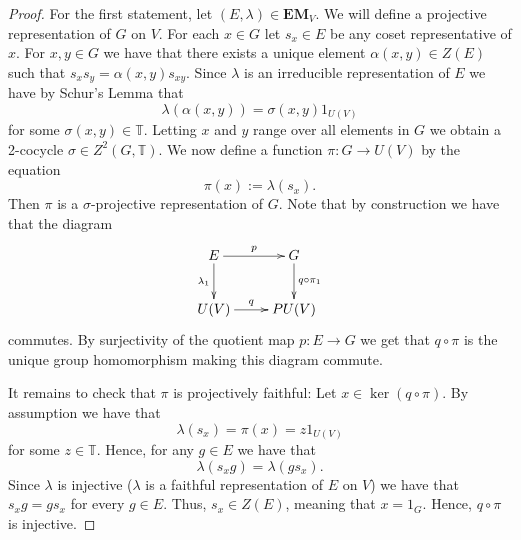\documentclass[10pt,a4paper]{amsart}
\newcommand{\EM}{\mathbf{EM}}
\newcommand{\bbT}{\mathbb{T}}
\begin{document}
\begin{proof}
    For the first statement, let $(E,\lambda) \in \EM_V$. We will define a projective representation of $G$ on $V$. For each $x \in G$ let $s_x \in E$ be any coset representative of $x$. For $x,y \in G$ we have that there exists a unique element $\alpha(x,y) \in Z(E)$ such that $s_x s_y = \alpha(x,y) s_{xy}$. Since $\lambda$ is an irreducible representation of $E$ we have by Schur's Lemma that
    \begin{equation*}
        \lambda(\alpha(x,y)) = \sigma(x,y)1_{U(V)}
    \end{equation*}
    for some $\sigma(x,y) \in \bbT$. Letting $x$ and $y$ range over all elements in $G$ we obtain a 2-cocycle $\sigma \in Z^2(G,\bbT)$. We now define a function $\pi \colon G \to U(V)$ by the equation
    \begin{equation*}
        \pi(x) := \lambda(s_x).
    \end{equation*}
    Then $\pi$ is a $\sigma$-projective representation of $G$. Note that by construction we have that the diagram
    \begin{equation*}
        \xymatrix{
            E \ar[r]^-{p} \ar[d]_-{\lambda_1} & G \ar[d]^-{q \circ \pi_1} \\
            U(V) \ar[r]^-{q} & PU(V)
        }
    \end{equation*}
    commutes. By surjectivity of the quotient map $p \colon E \to G$ we get that $q \circ \pi$ is the unique group homomorphism making this diagram commute.
    
    It remains to check that $\pi$ is projectively faithful: Let $x \in \ker{(q \circ \pi)}$. By assumption we have that 
    \begin{equation*}
        \lambda(s_x) = \pi(x) = z 1_{U(V)}
    \end{equation*}
    for some $z \in \bbT$. Hence, for any $g \in E$ we have that
    \begin{equation*}
        \lambda(s_x g) = \lambda(g s_x).
    \end{equation*}
    Since $\lambda$ is injective ($\lambda$ is a faithful representation of $E$ on $V$) we have that $s_x g = g s_x$ for every $g \in E$. Thus, $s_x \in Z(E)$, meaning that $x = 1_{G}$. Hence, $q \circ \pi$ is injective.


\end{proof}
\end{document}
